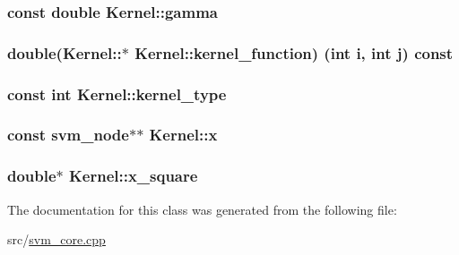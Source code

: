 \subsubsection[{gamma}]{\setlength{\rightskip}{0pt plus 5cm}const double Kernel\+::gamma\hspace{0.3cm}{\ttfamily [private]}}\hypertarget{classKernel_a3a8a0a00a7d58708d6a7c5bc9c872513}{}\label{classKernel_a3a8a0a00a7d58708d6a7c5bc9c872513}
\subsubsection[{kernel\+\_\+function}]{\setlength{\rightskip}{0pt plus 5cm}double(Kernel\+::$\ast$ Kernel\+::kernel\+\_\+function) (int i, int j) const \hspace{0.3cm}{\ttfamily [protected]}}\hypertarget{classKernel_ac7b39305896e51f9e1a08e026e2c4d9c}{}\label{classKernel_ac7b39305896e51f9e1a08e026e2c4d9c}
\subsubsection[{kernel\+\_\+type}]{\setlength{\rightskip}{0pt plus 5cm}const int Kernel\+::kernel\+\_\+type\hspace{0.3cm}{\ttfamily [private]}}\hypertarget{classKernel_a01e78214a5c60876d71ee05fe97f4566}{}\label{classKernel_a01e78214a5c60876d71ee05fe97f4566}
\subsubsection[{x}]{\setlength{\rightskip}{0pt plus 5cm}const {\bf svm\+\_\+node}$\ast$$\ast$ Kernel\+::x\hspace{0.3cm}{\ttfamily [private]}}\hypertarget{classKernel_a725a35660c4309605c2628fa8290ce5f}{}\label{classKernel_a725a35660c4309605c2628fa8290ce5f}
\subsubsection[{x\+\_\+square}]{\setlength{\rightskip}{0pt plus 5cm}double$\ast$ Kernel\+::x\+\_\+square\hspace{0.3cm}{\ttfamily [private]}}\hypertarget{classKernel_a97ca8abb41cd6ba8b1553738d59352d5}{}\label{classKernel_a97ca8abb41cd6ba8b1553738d59352d5}


The documentation for this class was generated from the following file\+:\begin{DoxyCompactItemize}
\item 
src/\hyperlink{svm__core_8cpp}{svm\+\_\+core.\+cpp}\end{DoxyCompactItemize}
